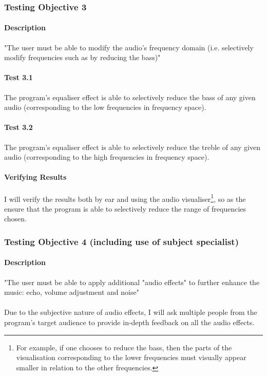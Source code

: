 \pagebreak
\subsubsection{Testing Objective 3}
\paragraph{Description} "The user must be able to modify the audio's frequency domain (i.e. selectively modify frequencies such as by reducing the bass)"

\paragraph{Test 3.1}
The program's equaliser effect is able to selectively reduce the bass of any given audio (corresponding to the low frequencies in frequency space).

\paragraph{Test 3.2}
The program's equaliser effect is able to selectively reduce the treble of any given audio (corresponding to the high frequencies in frequency space).

\paragraph{Verifying Results}
I will verify the results both by ear and using the audio visualiser\footnote{
	For example, if one chooses to reduce the bass, then the parts
	of the visualisation corresponding to the lower frequencies must
	visually appear smaller in relation to the other frequencies.
}, so as the ensure that the program is able to selectively reduce the range of frequencies chosen.

\pagebreak
\subsubsection{Testing Objective 4 (including use of subject specialist)}
\paragraph{Description} "The user must be able to apply additional "audio effects" to further enhance the music: echo, volume adjustment and noise"

\paragraph{}
Due to the subjective nature of audio effects, I will ask multiple people from the program's target audience to provide in-depth feedback on all the audio effects.

